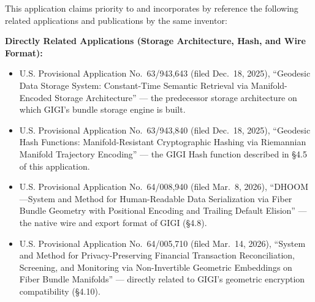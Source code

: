 \documentclass[11pt,letterpaper]{article}
\begin{document}
This application claims priority to and incorporates by reference the following related applications and publications by the same inventor:

\textbf{Directly Related Applications (Storage Architecture, Hash, and Wire Format):}
\begin{itemize}[nosep]
  \item U.S. Provisional Application No.~63/943,643 (filed Dec.~18, 2025), ``Geodesic Data Storage System: Constant-Time Semantic Retrieval via Manifold-Encoded Storage Architecture'' --- the predecessor storage architecture on which GIGI's bundle storage engine is built.
  \item U.S. Provisional Application No.~63/943,840 (filed Dec.~18, 2025), ``Geodesic Hash Functions: Manifold-Resistant Cryptographic Hashing via Riemannian Manifold Trajectory Encoding'' --- the GIGI Hash function described in \S4.5 of this application.
  \item U.S. Provisional Application No.~64/008,940 (filed Mar.~8, 2026), ``DHOOM---System and Method for Human-Readable Data Serialization via Fiber Bundle Geometry with Positional Encoding and Trailing Default Elision'' --- the native wire and export format of GIGI (\S4.8).
  \item U.S. Provisional Application No.~64/005,710 (filed Mar.~14, 2026), ``System and Method for Privacy-Preserving Financial Transaction Reconciliation, Screening, and Monitoring via Non-Invertible Geometric Embeddings on Fiber Bundle Manifolds'' --- directly related to GIGI's geometric encryption compatibility (\S4.10).
\end{itemize}
\end{document}
